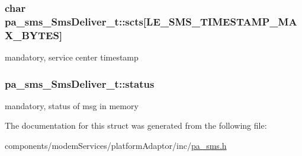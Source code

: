 \subsubsection[{\texorpdfstring{scts}{scts}}]{\setlength{\rightskip}{0pt plus 5cm}char pa\+\_\+sms\+\_\+\+Sms\+Deliver\+\_\+t\+::scts\mbox{[}{\bf L\+E\+\_\+\+S\+M\+S\+\_\+\+T\+I\+M\+E\+S\+T\+A\+M\+P\+\_\+\+M\+A\+X\+\_\+\+B\+Y\+T\+ES}\mbox{]}}\hypertarget{structpa__sms___sms_deliver__t_acd8f2f1d84041df813524876ed242e14}{}\label{structpa__sms___sms_deliver__t_acd8f2f1d84041df813524876ed242e14}


mandatory, service center timestamp 

\subsubsection[{\texorpdfstring{status}{status}}]{ pa\+\_\+sms\+\_\+\+Sms\+Deliver\+\_\+t\+::status}\hypertarget{structpa__sms___sms_deliver__t_a1a6aaecb73364ea1fc01b07529ef3225}{}\label{structpa__sms___sms_deliver__t_a1a6aaecb73364ea1fc01b07529ef3225}


mandatory, status of msg in memory 



The documentation for this struct was generated from the following file\+:\begin{DoxyCompactItemize}
\item 
components/modem\+Services/platform\+Adaptor/inc/\hyperlink{pa__sms_8h}{pa\+\_\+sms.\+h}\end{DoxyCompactItemize}
